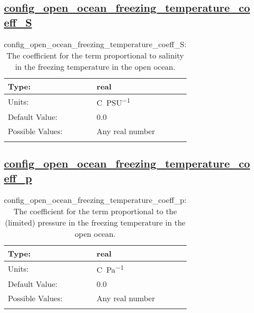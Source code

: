\subsection[config\_open\_ocean\_freezing\_temperature\_coeff\_S]{\hyperref[sec:nm_tab_eos]{config\_open\_ocean\_freezing\_temperature\_coeff\_S}}
\label{subsec:nm_sec_config_open_ocean_freezing_temperature_coeff_S}
\begin{center}
\begin{longtable}{| p{2.0in} || p{4.0in} |}
    \hline
    Type: & real \\
    \hline
    Units: & \si{C.PSU^{-1}} \\
    \hline
    Default Value: & 0.0 \\
    \hline
    Possible Values: & Any real number \\
    \hline
    \caption{config\_open\_ocean\_freezing\_temperature\_coeff\_S: The coefficient for the term proportional to salinity in the freezing temperature in the open ocean.}
\end{longtable}
\end{center}
\subsection[config\_open\_ocean\_freezing\_temperature\_coeff\_p]{\hyperref[sec:nm_tab_eos]{config\_open\_ocean\_freezing\_temperature\_coeff\_p}}
\label{subsec:nm_sec_config_open_ocean_freezing_temperature_coeff_p}
\begin{center}
\begin{longtable}{| p{2.0in} || p{4.0in} |}
    \hline
    Type: & real \\
    \hline
    Units: & \si{C.Pa^{-1}} \\
    \hline
    Default Value: & 0.0 \\
    \hline
    Possible Values: & Any real number \\
    \hline
    \caption{config\_open\_ocean\_freezing\_temperature\_coeff\_p: The coefficient for the term proportional to the (limited) pressure in the freezing temperature in the open ocean.}
\end{longtable}
\end{center}
